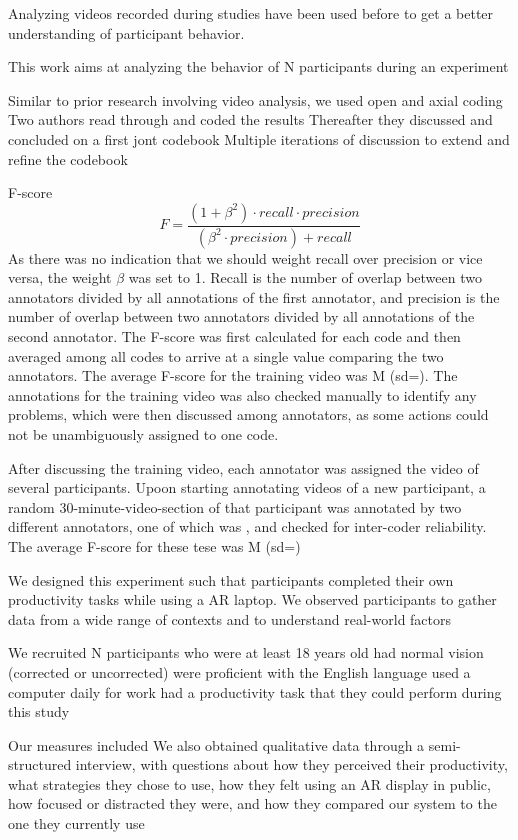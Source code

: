 
Analyzing videos recorded during studies have been used before to get a better understanding of participant behavior. 

This work aims at analyzing the behavior of N participants during an experiment

Similar to prior research involving video analysis, we used open and axial coding
Two authors read through and coded the results
Thereafter they discussed and concluded on a first jont codebook 
Multiple iterations of discussion to extend and refine the codebook 

F-score~\cite{} %
\begin{equation}
F = \frac{(1+\beta^2)\cdot recall \cdot precision}{(\beta^2 \cdot precision)+recall}
\end{equation}
As there was no indication that we should weight recall over precision or vice versa, the weight $\beta$ was set to 1. 
Recall is the number of overlap between two annotators divided by all annotations of the first annotator, and precision is the number of overlap between two annotators divided by all annotations of the second annotator. 
The F-score was first calculated for each code and then averaged among all codes to arrive at a single value comparing the two annotators. 
The average F-score for the training video was M (sd=).
The annotations for the training video was also checked manually to identify any problems, which were then discussed among annotators, as some actions could not be unambiguously assigned to one code. 

After discussing the training video, each annotator was assigned the video of several participants. Upoon starting annotating videos of a new participant, a random 30-minute-video-section of that participant was annotated by two different annotators, one of which was , and checked for inter-coder reliability. 
The average F-score for these tese was M (sd=)


We designed this experiment such that participants completed their own productivity tasks while using a AR laptop. 
We observed participants 
to gather data from a wide range of contexts and to understand real-world factors 

We recruited N participants
who were at least 18 years old
 had normal vision (corrected or uncorrected)
 were proficient with the English language
 used a computer daily for work 
 had a productivity task that they could perform during this study

 Our measures included
 We also obtained qualitative data through a semi-structured interview, with questions about 
 how they perceived their productivity, what strategies they chose to use, how they felt using an AR display in public, how focused or distracted they were, 
 and how they compared our system to the one they currently use

